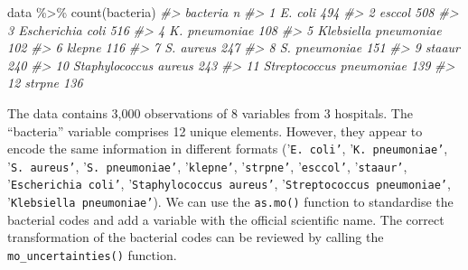 \documentclass[
]{book}
\newenvironment{Shaded}{\begin{snugshade}}{\end{snugshade}}
\newcommand{\CommentTok}[1]{\textcolor[rgb]{0.56,0.35,0.01}{\textit{#1}}}
\newcommand{\FunctionTok}[1]{\textcolor[rgb]{0.00,0.00,0.00}{#1}}
\newcommand{\NormalTok}[1]{#1}
\newcommand{\SpecialCharTok}[1]{\textcolor[rgb]{0.00,0.00,0.00}{#1}}
\begin{document}
\begin{Shaded}
\begin{Highlighting}[]
\NormalTok{data }\SpecialCharTok{\%\textgreater{}\%}
  \FunctionTok{count}\NormalTok{(bacteria)}
\CommentTok{\#\textgreater{}                    bacteria   n}
\CommentTok{\#\textgreater{} 1                   E. coli 494}
\CommentTok{\#\textgreater{} 2                    esccol 508}
\CommentTok{\#\textgreater{} 3          Escherichia coli 516}
\CommentTok{\#\textgreater{} 4             K. pneumoniae 108}
\CommentTok{\#\textgreater{} 5     Klebsiella pneumoniae 102}
\CommentTok{\#\textgreater{} 6                    klepne 116}
\CommentTok{\#\textgreater{} 7                 S. aureus 247}
\CommentTok{\#\textgreater{} 8             S. pneumoniae 151}
\CommentTok{\#\textgreater{} 9                    staaur 240}
\CommentTok{\#\textgreater{} 10    Staphylococcus aureus 243}
\CommentTok{\#\textgreater{} 11 Streptococcus pneumoniae 139}
\CommentTok{\#\textgreater{} 12                   strpne 136}
\end{Highlighting}
\end{Shaded}

The data contains 3,000 observations of 8 variables from 3 hospitals. The ``bacteria'' variable comprises 12 unique elements. However, they appear to encode the same information in different formats ('\texttt{E.\ coli’}, '\texttt{K.\ pneumoniae’}, '\texttt{S.\ aureus’}, '\texttt{S.\ pneumoniae’}, '\texttt{klepne’}, '\texttt{strpne’}, '\texttt{esccol’}, '\texttt{staaur’}, '\texttt{Escherichia\ coli’}, '\texttt{Staphylococcus\ aureus’}, '\texttt{Streptococcus\ pneumoniae’}, '\texttt{Klebsiella\ pneumoniae’}). We can use the \texttt{as.mo()} function to standardise the bacterial codes and add a variable with the official scientific name. The correct transformation of the bacterial codes can be reviewed by calling the \texttt{mo\_uncertainties()} function.
\end{document}
